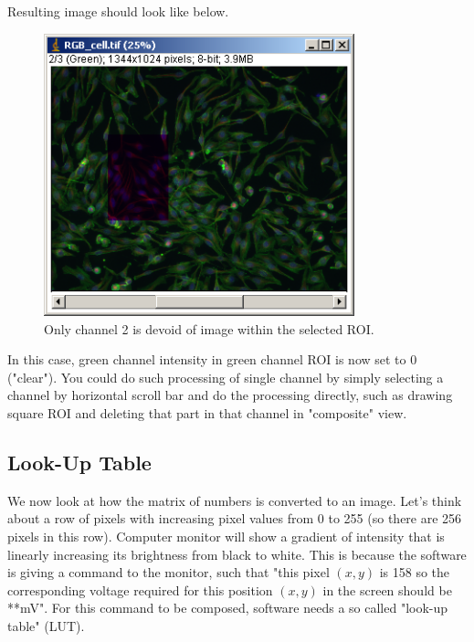 \begin{indentexercise}{1}
Resulting image should look like below. 
\begin{figure}[H]
\begin{center}
\includegraphics[width=9cm]{fig/CMCIBasicCourse201102-img23.png}
\caption{ Only channel 2 is devoid of image within the selected ROI.}
\label{fig:img23}
\end{center}
\end{figure}

In this case, green channel intensity in green channel ROI is now set to 0 ("clear"). You could do such
processing of single channel by simply selecting a channel by horizontal scroll bar and do the processing directly, such as drawing square ROI and deleting that part in that channel in "composite" view. 
\end{indentexercise}

\subsection{Look-Up Table }
\label{subsec:LUT}

We now look at how the matrix of numbers is converted to an image. Let's think about 
a row of pixels with increasing pixel values from 0 to 255 (so there are 256 pixels in this row). 
Computer monitor will show a gradient of intensity that is linearly increasing its brightness 
from black to white. This is because the software is giving a command to the monitor, 
such that "this pixel $(x, y)$ is 158 so the corresponding voltage required for this position $(x, y)$ 
in the screen should be **mV". For this command to be composed, software needs a so called "look-up table" (LUT). 


